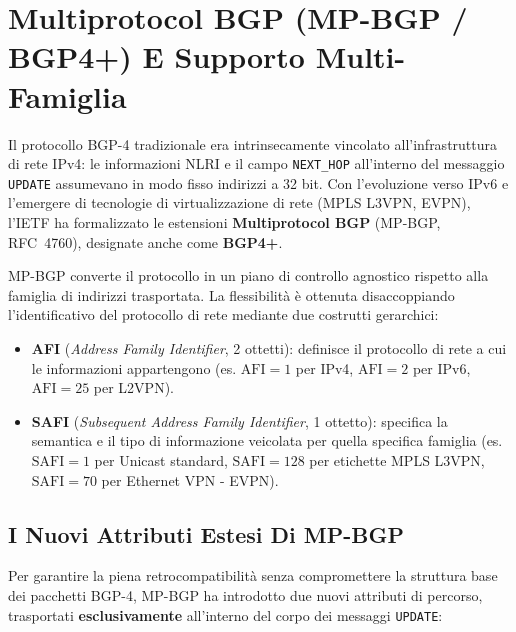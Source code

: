 \documentclass[11pt, a4paper]{article}
\begin{document}
\newpage


\section{Multiprotocol BGP (MP-BGP / BGP4+) E Supporto Multi-Famiglia}

Il protocollo BGP-4 tradizionale era intrinsecamente vincolato all'infrastruttura di rete IPv4: le informazioni NLRI e il campo \texttt{NEXT\_HOP} all'interno del messaggio \texttt{UPDATE} assumevano in modo fisso indirizzi a 32 bit. Con l'evoluzione verso IPv6 e l'emergere di tecnologie di virtualizzazione di rete (MPLS L3VPN, EVPN), l'IETF ha formalizzato le estensioni \textbf{Multiprotocol BGP} (MP-BGP, RFC~4760), designate anche come \textbf{BGP4+}.

MP-BGP converte il protocollo in un piano di controllo agnostico rispetto alla famiglia di indirizzi trasportata. La flessibilità è ottenuta disaccoppiando l'identificativo del protocollo di rete mediante due costrutti gerarchici:
\begin{itemize}[noitemsep]
    \item \textbf{AFI} (\emph{Address Family Identifier}, 2 ottetti): definisce il protocollo di rete a cui le informazioni appartengono (es. $\text{AFI}=1$ per IPv4, $\text{AFI}=2$ per IPv6, $\text{AFI}=25$ per L2VPN).
    \item \textbf{SAFI} (\emph{Subsequent Address Family Identifier}, 1 ottetto): specifica la semantica e il tipo di informazione veicolata per quella specifica famiglia (es. $\text{SAFI}=1$ per Unicast standard, $\text{SAFI}=128$ per etichette MPLS L3VPN, $\text{SAFI}=70$ per Ethernet VPN - EVPN).
\end{itemize}


\subsection{I Nuovi Attributi Estesi Di MP-BGP}

Per garantire la piena retrocompatibilità senza compromettere la struttura base dei pacchetti BGP-4, MP-BGP ha introdotto due nuovi attributi di percorso, trasportati \textbf{esclusivamente} all'interno del corpo dei messaggi \texttt{UPDATE}:
\end{document}
